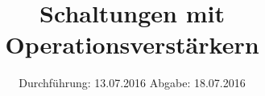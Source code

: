 


\subject{Versuchsprotokoll}
\title{Schaltungen mit Operationsverstärkern}
\date{
  Durchführung: 13.07.2016
  \hspace{3em}
  Abgabe: 18.07.2016
}




\maketitle
\thispagestyle{empty}







\printbibliography


